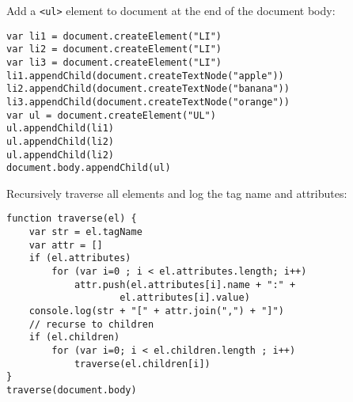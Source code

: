 \documentclass[trans,compress,xcolor=table]{beamer}
\begin{document}
\begin{frame}[fragile]
Add a \lstinline!<ul>! element to document at the end of
the document body:
\begin{lstlisting}
var li1 = document.createElement("LI")
var li2 = document.createElement("LI")
var li3 = document.createElement("LI")
li1.appendChild(document.createTextNode("apple"))
li2.appendChild(document.createTextNode("banana"))
li3.appendChild(document.createTextNode("orange"))
var ul = document.createElement("UL")
ul.appendChild(li1)
ul.appendChild(li2)
ul.appendChild(li2)
document.body.appendChild(ul)
\end{lstlisting}
\end{frame}

\begin{frame}[fragile]
Recursively traverse all elements and log the tag name and
attributes:
\begin{lstlisting}
function traverse(el) {
    var str = el.tagName
    var attr = []
    if (el.attributes)
        for (var i=0 ; i < el.attributes.length; i++)
            attr.push(el.attributes[i].name + ":" + 
                    el.attributes[i].value)
    console.log(str + "[" + attr.join(",") + "]")
    // recurse to children
    if (el.children)
        for (var i=0; i < el.children.length ; i++)
            traverse(el.children[i])
}
traverse(document.body)
\end{lstlisting}
\end{frame}
\end{document}
